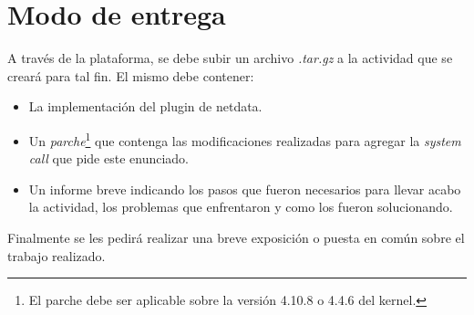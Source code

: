 \section{Modo de entrega}
A través de la plataforma, se debe subir un archivo \textit{.tar.gz} a la
actividad que se creará para tal fin. El mismo debe contener:

\begin{itemize}
    \item La implementación del plugin de netdata.
    \item Un \textit{parche}\footnote{El parche debe ser aplicable sobre la
        versión 4.10.8 o 4.4.6 del kernel.} que contenga las modificaciones
        realizadas para agregar la \textit{system call} que pide este
        enunciado.
    \item Un informe breve indicando los pasos que fueron necesarios para
        llevar acabo la actividad, los problemas que enfrentaron y como los
        fueron solucionando.
\end{itemize}

Finalmente se les pedirá realizar una breve exposición o puesta en
común sobre el trabajo realizado.
